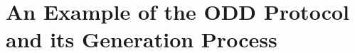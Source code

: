 \documentclass{article}
\theoremstyle{definition}
\theoremstyle{theorem}
\theoremstyle{proof}
\theoremstyle{remark}
\begin{document}
    



\clearpage











\appendix   


\section{An Example of the ODD Protocol and its Generation Process}\label{odd}
\end{document}
